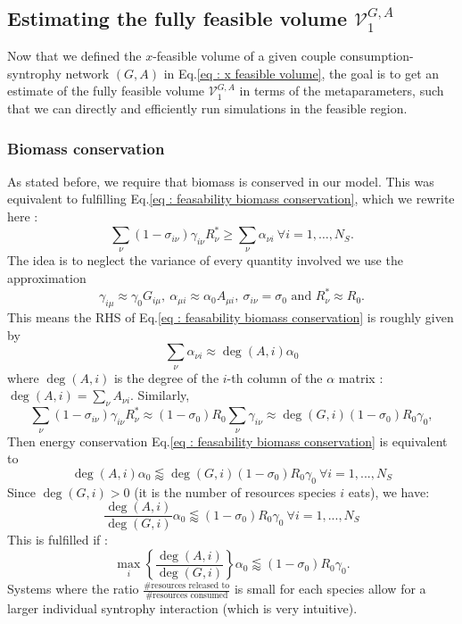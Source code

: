 \documentclass[12pt, titlepage]{report}
\begin{document}
\subsection{Estimating the fully feasible volume $\mathcal{V}^{G,A}_1$}
Now that we defined the $x$-feasible volume of a given couple consumption-syntrophy network $(G,A)$ in Eq.\eqref{eq : x feasible volume}, the goal is to get an estimate of the fully feasible volume $\mathcal{V}^{G,A}_1$ in terms of the metaparameters, such that we can directly and efficiently run simulations in the feasible region.
\subsubsection{Biomass conservation}
As stated before, we require that biomass is conserved in our model. This was equivalent to fulfilling Eq.\eqref{eq : feasability biomass conservation}, which we rewrite here :
\begin{equation}
\sum_\nu \left(1-\sigma_{i\nu}\right)\gamma_{i\nu}R^*_\nu \geq \sum_\nu \alpha_{\nu i} \ \forall i=1,\dots, N_S.
\end{equation}
The idea is to neglect the variance of every quantity involved \ie we use the approximation
\begin{equation}
\gamma_{i\mu} \approx \gamma_0 G_{i\mu}, \ \alpha_{\mu i}\approx \alpha_0 A_{\mu i}, \ \sigma_{i\nu} = \sigma_0 \text{ and }R^*_\nu \approx R_0.
\end{equation}
This means the RHS of Eq.\eqref{eq : feasability biomass conservation} is roughly given by
\begin{equation}
\sum_\nu \alpha_{\nu i} \approx \deg(A, i) \alpha_0
\end{equation}
where $\deg(A,i)$ is the degree of the $i$-th column of the $\alpha$ matrix : $\deg(A, i) = \sum_\nu A_{\nu i}$.
Similarly,
\begin{equation}
\sum_\nu \left(1-\sigma_{i\nu}\right)\gamma_{i\nu} R^*_\nu \approx (1-\sigma_0)R_0\sum_{\nu}\gamma_{i\nu} \approx \deg(G, i)(1-\sigma_0)R_0\gamma_0,
\end{equation}
Then energy conservation Eq.\eqref{eq : feasability biomass conservation} is equivalent to
\begin{equation}
\deg(A,i) \alpha_0 \lessapprox \deg(G,i) (1-\sigma_0)R_0\gamma_0 \ \forall i=1,...,N_S
\end{equation}
Since $\deg(G,i) > 0 $ (it is the number of resources species $i$ eats), we have:
\begin{equation}
\frac{\deg(A,i)}{\deg(G,i)} \alpha_0 \lessapprox (1-\sigma_0)R_0\gamma_0 \ \forall i=1,...,N_S
\end{equation}
This is fulfilled if :
\begin{equation}\label{eq: feasability energy conservation}
\boxed{
\max_i\left\{\frac{\deg(A,i)}{\deg(G,i)}\right\} \alpha_0 \lessapprox (1-\sigma_0)R_0 \gamma_0
}.
\end{equation}
  Systems where the ratio $\frac{\# \text{resources released to}}{\# \text{resources consumed}}$ is small for each species allow for a larger individual syntrophy interaction (which is very intuitive).
\end{document}
